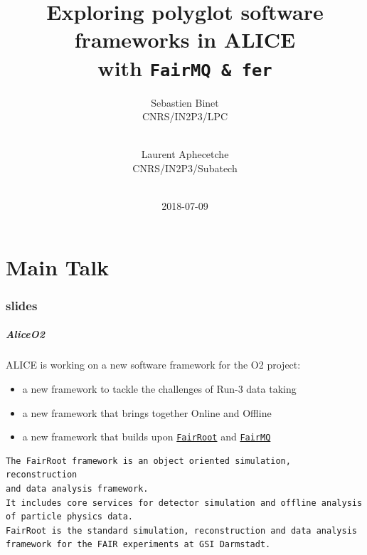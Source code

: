 \documentclass[9pt]{beamer}
\title[FairMQ and fer]{Exploring polyglot software frameworks in ALICE\\ with \tt{FairMQ} \& \texttt{fer}}
\date{2018-07-09}
\author[S.Binet \& L. Aphecetche]{
 \parbox{0.26\textwidth}{
	\texorpdfstring
	  {
		\centering
 		Sebastien Binet \\
 		CNRS/IN2P3/LPC \\
		\myblue{\href{mailto:binet@cern.ch}{\texttt{binet@cern.ch}}} \\
 	  }
	{Sebastien Binet}
}
 \and %
 \parbox{0.26\textwidth}{
	\texorpdfstring
	  {
		\centering
 		Laurent Aphecetche \\
 		CNRS/IN2P3/Subatech \\
 		\myblue{\href{mailto:laurent.aphecetche@cern.ch}{\texttt{laurent.aphecetche@cern.ch}}} \\
 	  }
	{Laurent Aphecetche}
}
 }
\institute[ALICE]{\insertlogo\hskip0.1cm}
\newcommand{\myblue} [1] {{\color{blue}#1}}
\begin{document}

\part<presentation>{Main Talk}

\section[slides]{slides}

\begin{frame}[fragile]
\frametitle{AliceO2}


ALICE is working on a new software framework for the O2 project:


\begin{itemize}
\item a new framework to tackle the challenges of Run-3 data taking
\item a new framework that brings together Online and Offline
\item a new framework that builds upon \myblue{\href{https://github.com/FairRootGroup/FairRoot}{\texttt{FairRoot}}} and \myblue{\href{https://github.com/FairRootGroup/FairMQ}{\texttt{FairMQ}}}
\end{itemize}


	\begin{exampleblock}{}
\begin{verbatim}
The FairRoot framework is an object oriented simulation, reconstruction
and data analysis framework.
It includes core services for detector simulation and offline analysis
of particle physics data.
FairRoot is the standard simulation, reconstruction and data analysis
framework for the FAIR experiments at GSI Darmstadt.
\end{verbatim}
	\end{exampleblock}{}



\end{frame}
\end{document}
